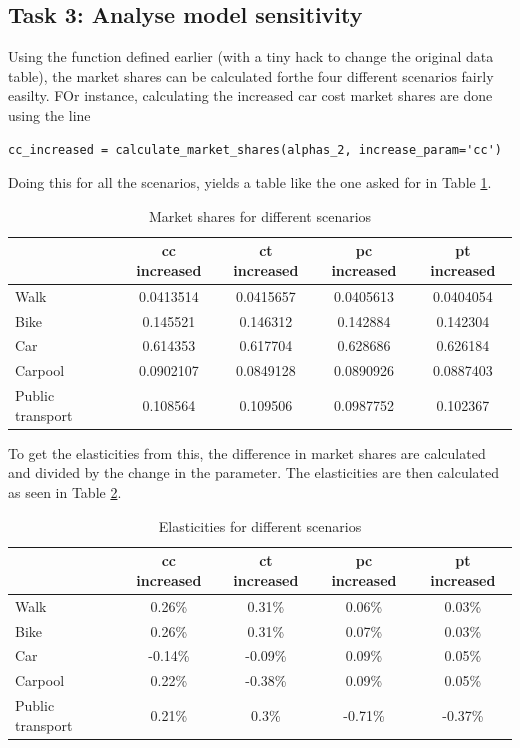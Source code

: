 \documentclass[a4paper,12pt]{article}
\begin{document}
\subsection{Task 3: Analyse model sensitivity}
Using the function defined earlier (with a tiny hack to change the original data table),
the market shares can be calculated forthe four different scenarios fairly easilty.
FOr instance, calculating the increased car cost market shares are done using the line
\begin{verbatim}
cc_increased = calculate_market_shares(alphas_2, increase_param='cc')
\end{verbatim}
Doing this for all the scenarios, yields a table like the one asked for in Table \ref{tab:market_shares}.
\begin{table}[h!]
    \centering
    \begin{tabular}{|l|c|c|c|c|}
        \hline
        & \textbf{cc increased} & \textbf{ct increased} & \textbf{pc increased} & \textbf{pt increased} \\
        \hline
        Walk & 0.0413514 & 0.0415657 & 0.0405613 & 0.0404054 \\
        \hline
        Bike & 0.145521 & 0.146312 & 0.142884 & 0.142304 \\
        \hline
        Car & 0.614353 & 0.617704 & 0.628686 & 0.626184 \\
        \hline
        Carpool & 0.0902107 & 0.0849128 & 0.0890926 & 0.0887403 \\
        \hline
        Public transport & 0.108564 & 0.109506 & 0.0987752 & 0.102367 \\
        \hline
    \end{tabular}
    \caption{Market shares for different scenarios}
    \label{tab:market_shares}
\end{table}

To get the elasticities from this, the difference in market shares are calculated and divided by the change in the parameter.
The elasticities are then calculated as seen in Table \ref{tab:elasticities}.
\begin{table}[h!]
    \centering
    \begin{tabular}{|l|c|c|c|c|}
        \hline
        & \textbf{cc increased} & \textbf{ct increased} & \textbf{pc increased} & \textbf{pt increased} \\
        \hline
        Walk & 0.26\% & 0.31\% & 0.06\% & 0.03\% \\
        \hline
        Bike & 0.26\% & 0.31\% & 0.07\% & 0.03\% \\
        \hline
        Car & -0.14\% & -0.09\% & 0.09\% & 0.05\% \\
        \hline
        Carpool & 0.22\% & -0.38\% & 0.09\% & 0.05\% \\
        \hline
        Public transport & 0.21\% & 0.3\% & -0.71\% & -0.37\% \\
        \hline
    \end{tabular}
    \caption{Elasticities for different scenarios}
    \label{tab:elasticities}
\end{table}
\end{document}
